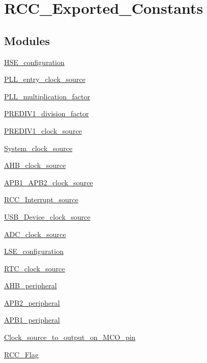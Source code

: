 \hypertarget{group__RCC__Exported__Constants}{
\section{RCC\_\-Exported\_\-Constants}
\label{group__RCC__Exported__Constants}
}
\subsection*{Modules}
\begin{DoxyCompactItemize}
\item 
\hyperlink{group__HSE__configuration}{HSE\_\-configuration}
\item 
\hyperlink{group__PLL__entry__clock__source}{PLL\_\-entry\_\-clock\_\-source}
\item 
\hyperlink{group__PLL__multiplication__factor}{PLL\_\-multiplication\_\-factor}
\item 
\hyperlink{group__PREDIV1__division__factor}{PREDIV1\_\-division\_\-factor}
\item 
\hyperlink{group__PREDIV1__clock__source}{PREDIV1\_\-clock\_\-source}
\item 
\hyperlink{group__System__clock__source}{System\_\-clock\_\-source}
\item 
\hyperlink{group__AHB__clock__source}{AHB\_\-clock\_\-source}
\item 
\hyperlink{group__APB1__APB2__clock__source}{APB1\_\-APB2\_\-clock\_\-source}
\item 
\hyperlink{group__RCC__Interrupt__source}{RCC\_\-Interrupt\_\-source}
\item 
\hyperlink{group__USB__Device__clock__source}{USB\_\-Device\_\-clock\_\-source}
\item 
\hyperlink{group__ADC__clock__source}{ADC\_\-clock\_\-source}
\item 
\hyperlink{group__LSE__configuration}{LSE\_\-configuration}
\item 
\hyperlink{group__RTC__clock__source}{RTC\_\-clock\_\-source}
\item 
\hyperlink{group__AHB__peripheral}{AHB\_\-peripheral}
\item 
\hyperlink{group__APB2__peripheral}{APB2\_\-peripheral}
\item 
\hyperlink{group__APB1__peripheral}{APB1\_\-peripheral}
\item 
\hyperlink{group__Clock__source__to__output__on__MCO__pin}{Clock\_\-source\_\-to\_\-output\_\-on\_\-MCO\_\-pin}
\item 
\hyperlink{group__RCC__Flag}{RCC\_\-Flag}
\end{DoxyCompactItemize}
